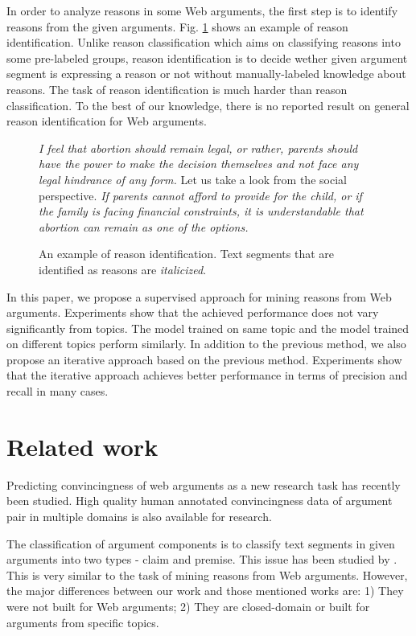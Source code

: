 \documentclass[11pt,a4paper]{article}
\begin{document}
In order to analyze reasons in some Web arguments, the first step is to identify reasons from the given arguments. Fig. \ref{figure:reasonidentification} shows an example of reason identification. Unlike reason classification which aims on classifying reasons into some pre-labeled groups\cite{hasan2014you}, reason identification is to decide wether given argument segment is expressing a reason or not without manually-labeled knowledge about reasons. The task of reason identification is much harder than reason classification. To the best of our knowledge, there is no reported result on general reason identification for Web arguments.


\begin{figure}

{\it I feel that abortion should remain legal, or rather, parents should have the power to make the decision themselves and not face any legal hindrance of any form.} Let us take a look from the social perspective. {\it If parents cannot afford to provide for the child, or if the family is facing financial constraints, it is understandable that abortion can remain as one of the options.}


\caption{An example of reason identification. Text segments that are identified as reasons are {\it italicized}.} 
\label{figure:reasonidentification}
\end{figure}

In this paper, we propose a supervised approach for mining reasons from Web arguments. Experiments show that the achieved performance does not vary significantly from topics. The model trained on same topic and the model trained on different topics perform similarly. In addition to the previous method, we also propose an iterative approach based on the previous method. Experiments show that the iterative approach achieves better performance in terms of precision and recall in many cases. 



\section{Related work}

Predicting convincingness of web arguments as a new research task has recently been studied\cite{habernal2016argument}. High quality human annotated convincingness data of argument pair in multiple domains is also available for research\cite{habernal2016argument}. 

The classification of argument components is to classify text segments in given arguments into two types - claim and premise\cite{stab2014argumentation}. This issue has been studied by \cite{rooney2012applying,feng2011classifying,palau2009argumentation,mochales2011argumentation}. This is very similar to the task of mining reasons from Web arguments. However, the major differences between our work and those mentioned works are: 1) They were not built for Web arguments; 2) They are closed-domain or built for arguments from specific topics.
\end{document}
